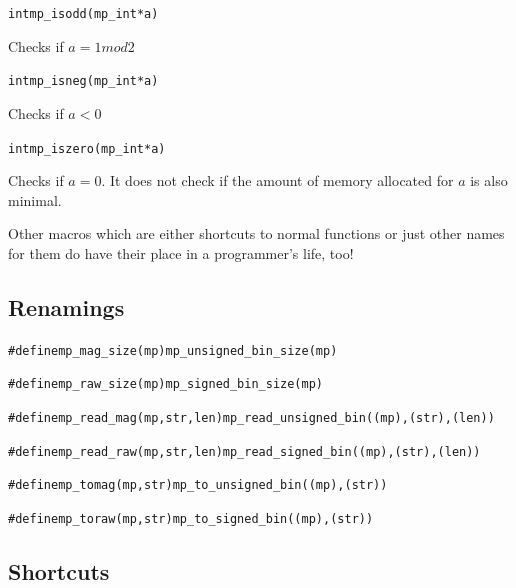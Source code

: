 \documentclass[synpaper]{book}
\begin{document}
\begin{alltt}
int mp_isodd(mp_int *a)
\end{alltt}
Checks if $a = 1 mod 2$

\begin{alltt}
int mp_isneg(mp_int *a)
\end{alltt}
Checks if $a < 0$

\begin{alltt}
int mp_iszero(mp_int *a)
\end{alltt}
Checks if $a = 0$. It does not check if the amount of memory allocated for $a$ is also minimal.

Other macros which are either shortcuts to normal functions or just other names for them do have their place in a programmer's life, too!

\subsection{Renamings}
\begin{alltt}
#define mp_mag_size(mp) mp_unsigned_bin_size(mp)
\end{alltt}

\begin{alltt}
#define mp_raw_size(mp) mp_signed_bin_size(mp)
\end{alltt}

\begin{alltt}
#define mp_read_mag(mp, str, len) mp_read_unsigned_bin((mp), (str), (len))
\end{alltt}

\begin{alltt}
 #define mp_read_raw(mp, str, len) mp_read_signed_bin((mp), (str), (len))
\end{alltt}

\begin{alltt}
#define mp_tomag(mp, str) mp_to_unsigned_bin((mp), (str))
\end{alltt}

\begin{alltt}
#define mp_toraw(mp, str)         mp_to_signed_bin((mp), (str))
\end{alltt}

\subsection{Shortcuts}
\end{document}
